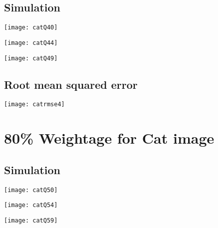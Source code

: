 \documentclass[a4paper, 12pt]{article}
\begin{document}
\subsection{Simulation}
\begin{center}
\begin{minipage}{0.45\linewidth}
    \texttt{[image: catQ40]}
    \label{fig:Q1_1}
\end{minipage}
\hfill
\begin{minipage}{0.45\linewidth}
    \texttt{[image: catQ44]}
    \label{fig:Q1_2}
\end{minipage}
\vspace{1.5 em}

\begin{minipage}{0.45\linewidth}
    \texttt{[image: catQ49]}
    \label{fig:Q1_2}
\end{minipage}
\vspace{1.5 em}
\end{center}

\subsection{Root mean squared error}

\begin{center}
\begin{minipage}{0.5\linewidth}
    \texttt{[image: catrmse4]}
    \label{fig:Q1_3}
\end{minipage}
\end{center}


\section{80\% Weightage for Cat image}
\subsection{Simulation}
\begin{center}
\begin{minipage}{0.45\linewidth}
    \texttt{[image: catQ50]}
    \label{fig:Q1_1}
\end{minipage}
\hfill
\begin{minipage}{0.45\linewidth}
    \texttt{[image: catQ54]}
    \label{fig:Q1_2}
\end{minipage}
\vspace{1.5 em}

\begin{minipage}{0.45\linewidth}
    \texttt{[image: catQ59]}
    \label{fig:Q1_2}
\end{minipage}
\vspace{1.5 em}
\end{center}
\end{document}
